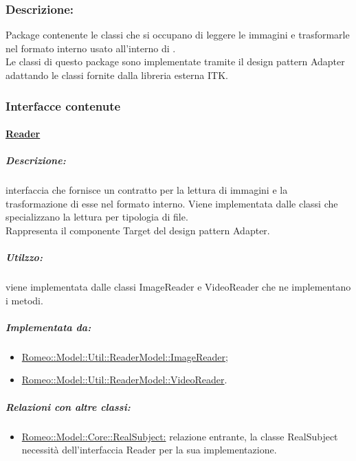 		\subsubsection{Descrizione:}
		\label{descr_readmod}
		Package\g{} contenente le classi che si occupano di leggere le immagini e trasformarle nel formato interno usato all'interno di \project{}.
		\\Le classi di questo package\g{} sono implementate tramite il design pattern\g{} Adapter adattando le classi fornite dalla libreria esterna ITK\g{}.


		\subsubsection{Interfacce contenute}
		\label{interface_readere}
			\paragraph{\underline{Reader}}
			\label{reader}
				\subparagraph{Descrizione:} interfaccia che fornisce un contratto per la lettura di immagini e la trasformazione di esse nel formato interno. Viene implementata dalle classi che specializzano la lettura per tipologia di file.
				\\Rappresenta il componente Target del design pattern\g{} Adapter.
				\subparagraph{Utilzzo:} viene implementata dalle classi ImageReader e VideoReader che ne implementano i metodi.				
				\subparagraph{Implementata da:}
					\begin{itemize}
						\item \hyperref[rea_img]{Romeo::Model::Util::ReaderModel::ImageReader};	
						\item \hyperref[rea_video]{Romeo::Model::Util::ReaderModel::VideoReader}.
					\end{itemize}
				\subparagraph{Relazioni con altre classi:}
					\begin{itemize}
						\item \hyperref[]{Romeo::Model::Core::RealSubject:} relazione entrante, la classe RealSubject necessità dell'interfaccia Reader per la sua implementazione.
					\end{itemize}

				\pagebreak

